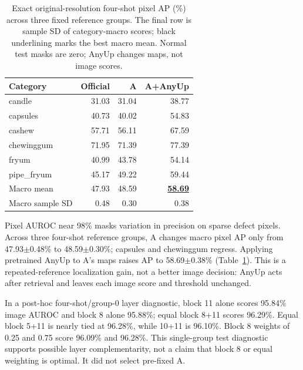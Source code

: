 \documentclass[times,10pt,twocolumn,letterpaper]{article}
\newcommand{\bestscore}[1]{\underline{\textbf{#1}}}
\begin{document}
\begin{table}[t]
\centering
\caption{Exact original-resolution four-shot pixel AP (\%) across three fixed reference groups. The final row is sample SD of category-macro scores; black underlining marks the best macro mean. Normal test masks are zero; AnyUp changes maps, not image scores.}
\label{tab:pixelap}
\small
\begin{tabular}{lrrr}
\toprule
Category & Official & A & A+AnyUp\\
\midrule
candle & 31.03 & 31.04 & 38.77\\
capsules & 40.73 & 40.02 & 54.83\\
cashew & 57.71 & 56.11 & 67.59\\
chewinggum & 71.95 & 71.39 & 77.39\\
fryum & 40.99 & 43.78 & 54.14\\
pipe\_fryum & 45.17 & 49.22 & 59.44\\
\midrule
Macro mean & 47.93 & 48.59 & \bestscore{58.69}\\
Macro sample SD & 0.48 & 0.30 & 0.38\\
\bottomrule
\end{tabular}
\end{table}

Pixel AUROC near 98\% masks variation in precision on sparse defect pixels. Across three four-shot reference groups, A changes macro pixel AP only from 47.93$\pm$0.48\% to 48.59$\pm$0.30\%; capsules and chewinggum regress. Applying pretrained AnyUp to A's maps raises AP to 58.69$\pm$0.38\% (Table~\ref{tab:pixelap}). This is a repeated-reference localization gain, not a better image decision: AnyUp acts after retrieval and leaves each image score and threshold unchanged.

In a post-hoc four-shot/group-0 layer diagnostic, block 11 alone scores 95.84\% image AUROC and block 8 alone 95.88\%; equal block 8+11 scores 96.29\%. Equal block 5+11 is nearly tied at 96.28\%, while 10+11 is 96.10\%. Block 8 weights of 0.25 and 0.75 score 96.09\% and 96.28\%. This single-group test diagnostic supports possible layer complementarity, not a claim that block 8 or equal weighting is optimal. It did not select pre-fixed A.
\end{document}
